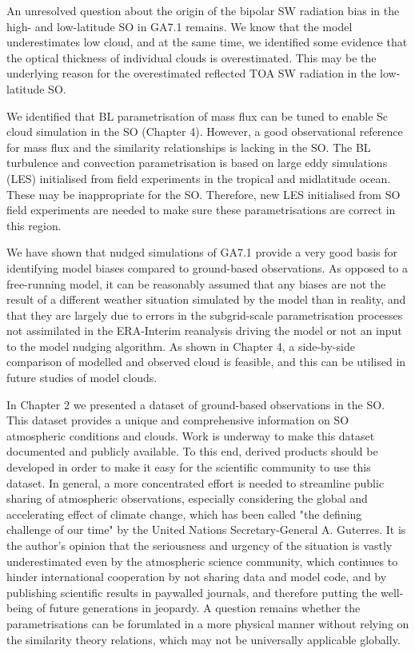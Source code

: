 An unresolved question about the origin of the bipolar SW radiation
bias in the high- and low-latitude SO in GA7.1 remains. We know that
the model underestimates low cloud, and at the same time, we identified
some evidence that the optical thickness of individual clouds is overestimated.
This may be the underlying reason for the overestimated reflected TOA SW
radiation in the low-latitude SO.

We identified that BL parametrisation of mass flux can be tuned
to enable Sc cloud simulation in the SO (Chapter 4). However,
a good observational reference for mass flux and the similarity relationships
is lacking in the SO. The BL turbulence and convection
parametrisation is based on large eddy simulations (LES) initialised
from field experiments in the tropical and midlatitude ocean. These may be
inappropriate for the SO. Therefore, new LES initialised from SO field
experiments are needed to make sure these parametrisations are correct in this
region.

We have shown that nudged simulations of GA7.1 provide a very good basis
for identifying model biases compared to ground-based observations. As opposed
to a free-running model, it can be reasonably assumed that any biases are
not the result of a different weather situation simulated by the model
than in reality, and that they are largely due to errors in the subgrid-scale
parametrisation processes not assimilated in the ERA-Interim reanalysis driving
the model or not an input to the model nudging algorithm. As shown in Chapter 4,
a side-by-side comparison of modelled and observed cloud is feasible, and this
can be utilised in future studies of model clouds.

In Chapter 2 we presented a dataset of ground-based observations in the SO.
This dataset provides a unique and comprehensive information on SO atmospheric
conditions and clouds. Work is underway to make this dataset documented and
publicly available. To this end, derived products should be developed in order
to make it easy for the scientific community to use this dataset. In general,
a more concentrated effort is needed to streamline public sharing of atmospheric
observations, especially considering the global and accelerating
effect of climate change, which has been called
"the defining challenge of our time" \citep{wmo2019} by the United Nations
Secretary-General A. Guterres. It is the author's opinion that the
seriousness and urgency of the situation is vastly underestimated even
by the atmospheric science community, which continues to hinder international
cooperation by not sharing data and model code, and by publishing scientific
results in paywalled journals, and therefore putting the well-being of future
generations in jeopardy. A question remains whether the parametrisations
can be forumlated in a more physical manner without relying on the similarity
theory relations, which may not be universally applicable globally.

